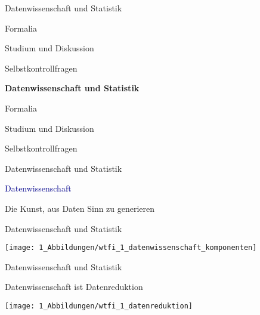 \documentclass[
  8pt,
  ignorenonframetext,
]{beamer}
\begin{document}
\begin{frame}{}
\protect\hypertarget{section-5}{}
\vfill
{}
\Large

Datenwissenschaft und Statistik

Formalia

Studium und Diskussion

Selbstkontrollfragen
\end{frame}

\begin{frame}{}
\protect\hypertarget{section-6}{}
\vfill
{}
\Large

\textbf{Datenwissenschaft und Statistik}

Formalia

Studium und Diskussion

Selbstkontrollfragen
\end{frame}

\begin{frame}{Datenwissenschaft und Statistik}
\protect\hypertarget{datenwissenschaft-und-statistik}{}
\vfill

\center
\huge

\textcolor{darkblue}{Datenwissenschaft} \vspace{5mm}

\Large

Die Kunst, aus Daten Sinn zu generieren
\end{frame}

\begin{frame}{Datenwissenschaft und Statistik}
\protect\hypertarget{datenwissenschaft-und-statistik-1}{}
\vspace{2mm}

\begin{center}\texttt{[image: 1\_Abbildungen/wtfi\_1\_datenwissenschaft\_komponenten]} \end{center}
\vfill
\end{frame}

\begin{frame}{Datenwissenschaft und Statistik}
\protect\hypertarget{datenwissenschaft-und-statistik-2}{}
\Large

Datenwissenschaft ist Datenreduktion

\center
\vspace{.4cm}

\begin{center}\texttt{[image: 1\_Abbildungen/wtfi\_1\_datenreduktion]} \end{center}
\end{frame}
\end{document}
